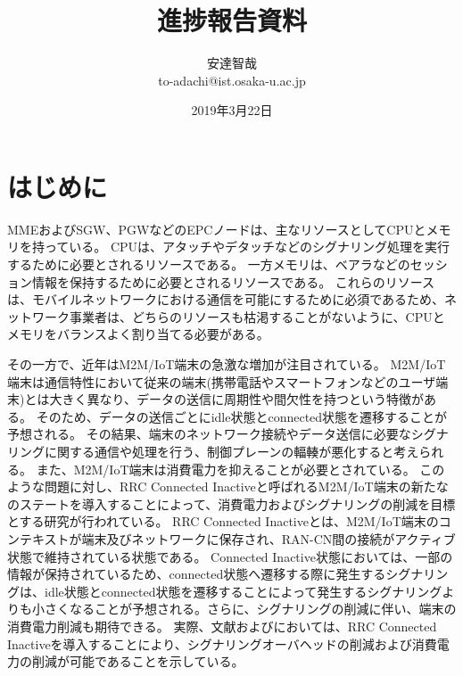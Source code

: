 \documentclass[a4j]{ujarticle}
\title{進捗報告資料}
\author{安達智哉\\to-adachi@ist.osaka-u.ac.jp}
\date{2019年3月22日}
\begin{document}
\maketitle




\section{はじめに}
  \label{sec:abs}
MMEおよびSGW、PGWなどのEPCノードは、主なリソースとしてCPUとメモリを持っている。
CPUは、アタッチやデタッチなどのシグナリング処理を実行するために必要とされるリソースである。
一方メモリは、ベアラなどのセッション情報を保持するために必要とされるリソースである。
これらのリソースは、モバイルネットワークにおける通信を可能にするために必須であるため、ネットワーク事業者は、どちらのリソースも枯渇することがないように、CPUとメモリをバランスよく割り当てる必要がある。

その一方で、近年はM2M/IoT端末の急激な増加が注目されている。
M2M/IoT端末は通信特性において従来の端末(携帯電話やスマートフォンなどのユーザ端末)とは大きく異なり、データの送信に周期性や間欠性を持つという特徴がある。
そのため、データの送信ごとにidle状態とconnected状態を遷移することが予想される。
その結果、端末のネットワーク接続やデータ送信に必要なシグナリングに関する通信や処理を行う、制御プレーンの輻輳が悪化すると考えられる。
また、M2M/IoT端末は消費電力を抑えることが必要とされている。
このような問題に対し、RRC Connected Inactiveと呼ばれるM2M/IoT端末の新たなのステートを導入することによって、消費電力およびシグナリングの削減を目標とする研究が行われている。
RRC Connected Inactiveとは、M2M/IoT端末のコンテキストが端末及びネットワークに保存され、RAN-CN間の接続がアクティブ状態で維持されている状態である。
Connected Inactive状態においては、一部の情報が保持されているため、connected状態へ遷移する際に発生するシグナリングは、idle状態とconnected状態を遷移することによって発生するシグナリングよりも小さくなることが予想される。さらに、シグナリングの削減に伴い、端末の消費電力削減も期待できる。
実際、文献\cite{RRCStateHandlingfor5G}および\cite{ANovelStateModelfor5GRadioAccessNetworks}においては、RRC Connected Inactiveを導入することにより、シグナリングオーバヘッドの削減および消費電力の削減が可能であることを示している。
\end{document}

